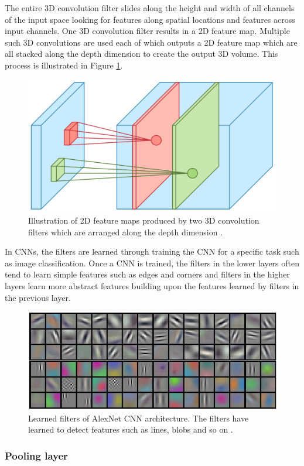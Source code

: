The entire 3D convolution filter slides along the height and width of all channels of the input space looking for features along spatial locations and features across input channels. One 3D convolution filter results in a 2D feature map. Multiple such 3D convolutions are used each of which outputs a 2D feature map which are all stacked along the depth dimension to create the output 3D volume. This process is illustrated in Figure \ref{Fig:3dconv}.

	\begin{figure}[h]
		\centering
		\includegraphics[width=.3\linewidth]{images/3d_conv}
		\caption{Illustration of 2D feature maps produced by two 3D convolution filters which are arranged along the depth dimension  \cite{towardsdatascience}.}
		\label{Fig:3dconv}
	\end{figure}
	
In CNNs, the filters are learned through training the CNN for a specific task such as image classification. Once a CNN is trained, the filters in the lower layers often tend to learn simple features such as edges and corners and filters in the higher layers learn more abstract features building upon the features learned by filters in the previous layer. 

	\begin{figure}[h]
		\centering
		\includegraphics[width=.8\linewidth]{images/conv_template}
		\caption{Learned filters of AlexNet CNN architecture. The filters have learned to detect features such as lines, blobs and so on \cite{cs231n}.}
		\label{Fig:conv_template}
	\end{figure}
	

\subsubsection{Pooling layer}


